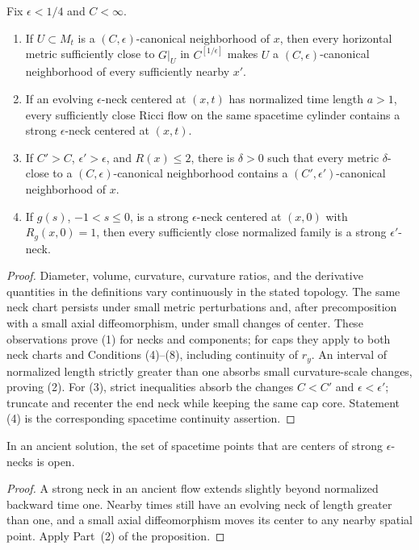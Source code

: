 \begin{proposition}\label{prop:canonical-neighborhood-stability}
\label{canonvary}

Fix $\epsilon<1/4$ and $C<\infty$.
\begin{enumerate}
\item[(1)] If $U\subset M_t$ is a $(C,\epsilon)$-canonical
neighborhood of $x$, then every horizontal metric sufficiently
close to $G|_U$ in $C^{[1/\epsilon]}$ makes $U$ a
$(C,\epsilon)$-canonical neighborhood of every sufficiently nearby
$x'$.
\item[(2)] If an evolving $\epsilon$-neck centered at $(x,t)$ has
normalized time length $a>1$, every sufficiently close Ricci flow on
the same spacetime cylinder contains a strong $\epsilon$-neck
centered at $(x,t)$.
\item[(3)] If $C'>C$, $\epsilon'>\epsilon$, and $R(x)\leq2$, there
is $\delta>0$ such that every metric $\delta$-close to a
$(C,\epsilon)$-canonical neighborhood contains a
$(C',\epsilon')$-canonical neighborhood of $x$.
\item[(4)] If $g(s)$, $-1<s\leq0$, is a strong $\epsilon$-neck
centered at $(x,0)$ with $R_g(x,0)=1$, then every sufficiently close
normalized family is a strong $\epsilon'$-neck.
\end{enumerate}
\end{proposition}
\begin{proof}
\sketch Diameter, volume, curvature, curvature ratios, and the
derivative quantities in the definitions vary continuously in the
stated topology. The same neck chart persists under small metric
perturbations and, after precomposition with a small axial
diffeomorphism, under small changes of center. These observations
prove (1) for necks and components; for caps they apply to both neck
charts and Conditions (4)--(8), including continuity of $r_y$.
An interval of normalized length strictly greater than one absorbs
small curvature-scale changes, proving (2). For (3), strict
inequalities absorb the changes $C<C'$ and
$\epsilon<\epsilon'$; truncate and recenter the end neck while
keeping the same cap core. Statement (4) is the corresponding
spacetime continuity assertion.
\end{proof}

\begin{corollary}\label{cor:strong-neck-centers-open}
\label{strepsopen}

In an ancient solution, the set of spacetime points that are centers
of strong $\epsilon$-necks is open.
\end{corollary}
\begin{proof}
\sketch
{}
A strong neck in an ancient flow extends slightly beyond normalized
backward time one. Nearby times still have an evolving neck of
length greater than one, and a small axial diffeomorphism moves its
center to any nearby spatial point. Apply Part~(2) of the
proposition.
\end{proof}

